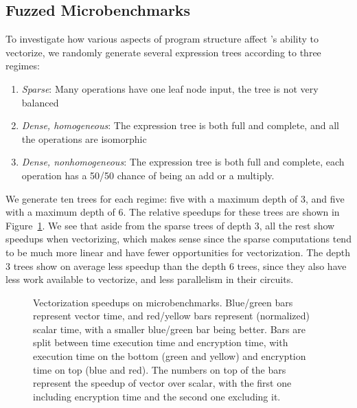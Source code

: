\subsection{Fuzzed Microbenchmarks}
To investigate how various aspects of program structure affect \system's ability to vectorize, we randomly generate several expression trees according to three regimes:
\begin{enumerate}
    \item {\em Sparse}: Many operations have one leaf node input, the tree is not very balanced
    \item {\em Dense, homogeneous}: The expression tree is both full and complete, and all the operations are isomorphic
    \item {\em Dense, nonhomogeneous}: The expression tree is both full and complete, each operation has a 50/50 chance of being an add or a multiply.
\end{enumerate}
We generate ten trees for each regime: five with a maximum depth of 3, and five with a maximum depth of 6.
The relative speedups for these trees are shown in Figure~\ref{fig:fuzzed-trees}.
We see that aside from the sparse trees of depth 3, all the rest show speedups when vectorizing, which makes sense since the sparse computations tend to be much more linear and have fewer opportunities for vectorization.
The depth 3 trees show on average less speedup than the depth 6 trees, since they also have less work available to vectorize, and less parallelism in their circuits. %

\begin{figure}
    \vspace{-0.5em}
    \caption{Vectorization speedups on microbenchmarks. Blue/green bars represent vector time, and red/yellow bars represent (normalized) scalar time, with a smaller blue/green bar being better. Bars are split between time execution time and encryption time, with execution time on the bottom (green and yellow) and encryption time on top (blue and red). The numbers on top of the bars represent the speedup of vector over scalar, with the first one including encryption time and the second one excluding it.}\label{fig:fuzzed-trees}
\end{figure}